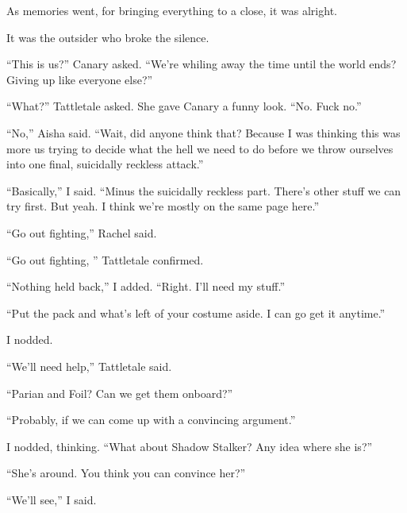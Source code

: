 As memories went, for bringing everything to a close, it was alright.



It was the outsider who broke the silence.



``This is us?''  Canary asked.  ``We're whiling away the time until the world ends?  Giving up like everyone else?''



``What?''  Tattletale asked.  She gave Canary a funny look.  ``No.  Fuck no.''



``No,'' Aisha said.  ``Wait, did anyone think that?  Because I was thinking this was more us trying to decide what the hell we need to do before we throw ourselves into one final, suicidally reckless attack.''



``Basically,'' I said.  ``Minus the suicidally reckless part.  There's other stuff we can try first.  But yeah.  I think we're mostly on the same page here.''



``Go out fighting,'' Rachel said.



``Go out fighting, '' Tattletale confirmed.



``Nothing held back,'' I added.  ``Right.  I'll need my stuff.''



``Put the pack and what's left of your costume aside.  I can go get it anytime.''



I nodded.



``We'll need help,'' Tattletale said.



``Parian and Foil?  Can we get them onboard?''



``Probably, if we can come up with a convincing argument.''



I nodded, thinking.  ``What about Shadow Stalker?  Any idea where she is?''



``She's around.  You think you can convince her?''



``We'll see,'' I said.



